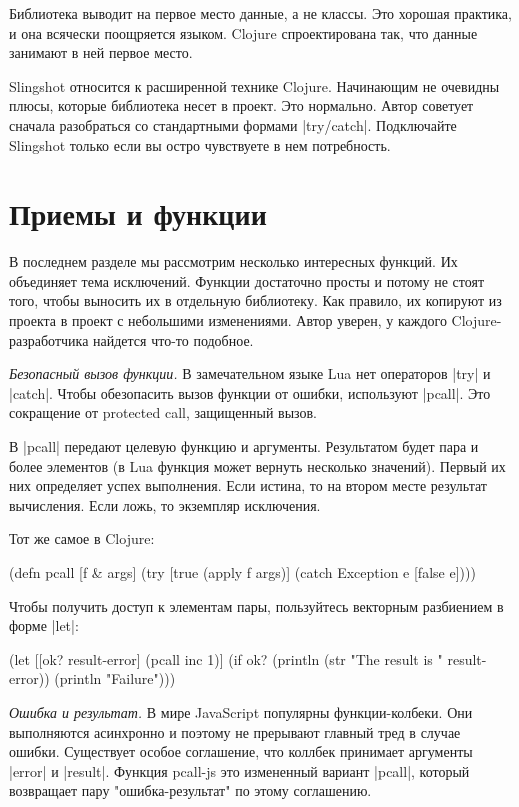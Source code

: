 Библиотека выводит на первое место данные, а не классы. Это хорошая практика, и
она всячески поощряется языком. Clojure спроектирована так, что данные занимают
в ней первое место.

Slingshot относится к расширенной технике Clojure. Начинающим не очевидны плюсы,
которые библиотека несет в проект. Это нормально. Автор советует сначала
разобраться со стандартными формами \spverb|try/catch|. Подключайте Slingshot только
если вы остро чувствуете в нем потребность.

\section{Приемы и функции}

В последнем разделе мы рассмотрим несколько интересных функций. Их объединяет
тема исключений. Функции достаточно просты и потому не стоят того, чтобы
выносить их в отдельную библиотеку. Как правило, их копируют из проекта в проект
с небольшими изменениями. Автор уверен, у каждого Clojure-разработчика найдется
что-то подобное.

\emph{Безопасный вызов функции.} В замечательном языке Lua нет операторов \spverb|try| и
\spverb|catch|. Чтобы обезопасить вызов функции от ошибки, используют \spverb|pcall|. Это
сокращение от protected call, защищенный вызов.

В \spverb|pcall| передают целевую функцию и аргументы. Результатом будет пара и более
элементов (в Lua функция может вернуть несколько значений). Первый их них
определяет успех выполнения. Если истина, то на втором месте результат
вычисления. Если ложь, то экземпляр исключения.

Тот же самое в Clojure:

\begin{code}
(defn pcall
  [f & args]
  (try
    [true (apply f args)]
    (catch Exception e
      [false e])))
\end{code}

Чтобы получить доступ к элементам пары, пользуйтесь векторным разбиением в форме
\spverb|let|:

\begin{code}
(let [[ok? result-error] (pcall inc 1)]
  (if ok?
    (println (str "The result is " result-error))
    (println "Failure")))
\end{code}

\emph{Ошибка и результат.} В мире JavaScript популярны функции-колбеки. Они
выполняются асинхронно и поэтому не прерывают главный тред в случае
ошибки. Существует особое соглашение, что коллбек принимает аргументы \spverb|error| и
\spverb|result|. Функция pcall-js это измененный вариант \spverb|pcall|, который возвращает
пару "ошибка-результат" по этому соглашению.

